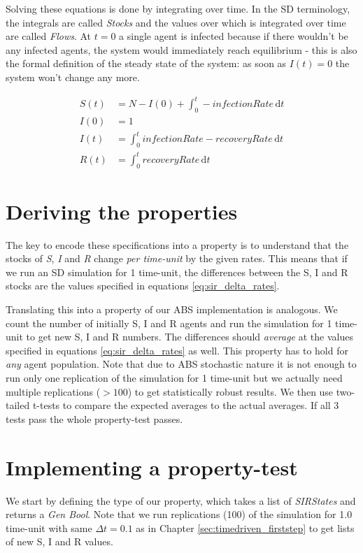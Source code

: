 Solving these equations is done by integrating over time. In the SD terminology, the integrals are called \textit{Stocks} and the values over which is integrated over time are called \textit{Flows}. At $t = 0$ a single agent is infected because if there wouldn't be any infected agents, the system would immediately reach equilibrium - this is also the formal definition of the steady state of the system: as soon as $I(t) = 0$ the system won't change any more.

\begin{align}
S(t) &= N - I(0) + \int_0^t -infectionRate\, \mathrm{d}t \\
I(0) &= 1 \\
I(t) &= \int_0^t infectionRate - recoveryRate\, \mathrm{d}t \\
R(t) &= \int_0^t recoveryRate\, \mathrm{d}t
\end{align}

\section{Deriving the properties}
The key to encode these specifications into a property is to understand that the stocks of \textit{S}, \textit{I} and \textit{R} change \textit{per time-unit} by the given rates. This means that if we run an SD simulation for 1 time-unit, the differences between the S, I and R stocks are the values specified in equations \ref{eq:sir_delta_rates}. %

Translating this into a property of our ABS implementation is analogous. We count the number of initially S, I and R agents and run the simulation for 1 time-unit to get new S, I and R numbers. The differences should \textit{average} at the values specified in equations \ref{eq:sir_delta_rates} as well. This property has to hold for \textit{any} agent population. Note that due to ABS stochastic nature it is not enough to run only one replication of the simulation for 1 time-unit but we actually need multiple replications ($> 100$) to get statistically robust results. We then use two-tailed t-tests to compare the expected averages to the actual averages. If all 3 tests pass the whole property-test passes.

\section{Implementing a property-test}
We start by defining the type of our property, which takes a list of \textit{SIRStates} and returns a \textit{Gen Bool}. Note that we run replications (100) of the simulation for 1.0 time-unit with same $\Delta t = 0.1$ as in Chapter \ref{sec:timedriven_firststep} to get lists of new S, I and R values.

